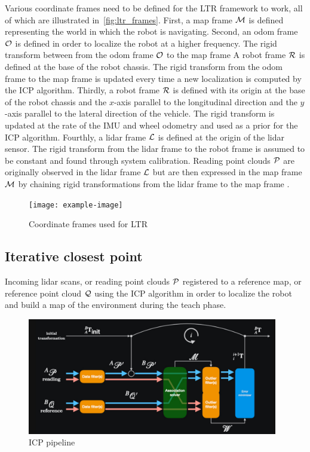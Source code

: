Various coordinate frames need to be defined for the \ac{LTR} framework to work, all of which are illustrated in~\autoref{fig:ltr_frames}.
First, a map frame $\mathcal{M}$ is defined representing the world in which the robot is navigating.
Second, an odom frame $\mathcal{O}$ is defined in order to localize the robot at a higher frequency. %
The rigid transform between from the odom frame $\mathcal{O}$ to the map frame %
A robot frame $\mathcal{R}$ is defined at the base of the robot chassis. 
The rigid transform from the odom frame to the map frame \transform{\odomf}{\mapf} is updated every time a new localization is computed by the \ac{ICP} algorithm.
Thirdly, a robot frame $\mathcal{R}$ is defined with its origin at the base of the robot chassis and the $x$-axis parallel to the longitudinal direction and the $y$-axis parallel to the lateral direction of the vehicle.
The rigid transform \transform{\robotf}{\odomf} is updated at the rate of the \ac{IMU} and wheel odometry and used as a prior for the \ac{ICP} algorithm.
Fourthly, a lidar frame $\mathcal{L}$ is defined at the origin of the lidar sensor. 
The rigid transform from the lidar frame to the robot frame \transform{\lidarf}{\robotf} is assumed to be constant and found through system calibration.
Reading point clouds $\mathcal{P}$ are originally observed in the lidar frame $\mathcal{L}$ but are then expressed in the map frame $\mathcal{M}$ by chaining rigid transformations from the lidar frame to the map frame \transform{\lidarf}{\mapf}.

\begin{figure} [htpb]
	\centering
	\texttt{[image: example-image]}
	\caption{Coordinate frames used for \ac{LTR}}
	\label{fig:ltr_frames}
\end{figure}

\subsection{Iterative closest point}
\label{ICP}

Incoming lidar scans, or reading point clouds $\mathcal{P}$ registered to a reference map, or reference point cloud $\mathcal{Q}$ using the \ac{ICP} algorithm in order to localize the robot and build a map of the environment during the teach phase.

\begin{figure} [htpb]
	\centering
	\includegraphics[height=2.0in]{figs/icp_pipeline.pdf}
	\caption{ICP pipeline}
	\label{fig:icp_pipeline}
\end{figure}

